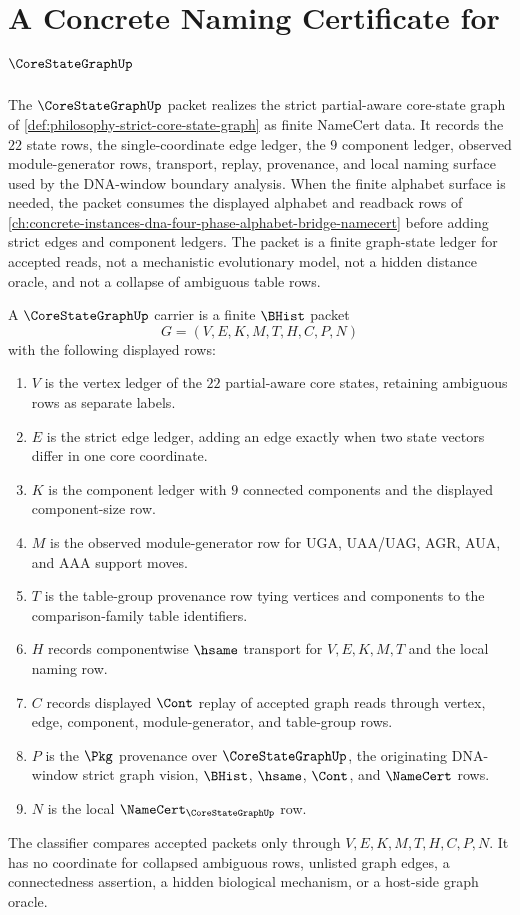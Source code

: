 \chapter{A Concrete Naming Certificate for $\CoreStateGraphUp$}
\label{ch:concrete-instances-core-state-graph-namecert}

The $\CoreStateGraphUp$ packet realizes the strict partial-aware core-state graph of \autoref{def:philosophy-strict-core-state-graph} as finite NameCert data. It records the $22$ state rows, the single-coordinate edge ledger, the $9$ component ledger, observed module-generator rows, transport, replay, provenance, and local naming surface used by the DNA-window boundary analysis. When the finite alphabet surface is needed, the packet consumes the displayed alphabet and readback rows of \autoref{ch:concrete-instances-dna-four-phase-alphabet-bridge-namecert} before adding strict edges and component ledgers. The packet is a finite graph-state ledger for accepted reads, not a mechanistic evolutionary model, not a hidden distance oracle, and not a collapse of ambiguous table rows.

\begin{definition}
\label{def:core-state-graph-carrier}
A $\CoreStateGraphUp$ carrier is a finite $\BHist$ packet
$$
G=(V,E,K,M,T,H,C,P,N)
$$
with the following displayed rows:
\begin{enumerate}
\item $V$ is the vertex ledger of the $22$ partial-aware core states, retaining ambiguous rows as separate labels.
\item $E$ is the strict edge ledger, adding an edge exactly when two state vectors differ in one core coordinate.
\item $K$ is the component ledger with $9$ connected components and the displayed component-size row.
\item $M$ is the observed module-generator row for UGA, UAA/UAG, AGR, AUA, and AAA support moves.
\item $T$ is the table-group provenance row tying vertices and components to the comparison-family table identifiers.
\item $H$ records componentwise $\hsame$ transport for $V,E,K,M,T$ and the local naming row.
\item $C$ records displayed $\Cont$ replay of accepted graph reads through vertex, edge, component, module-generator, and table-group rows.
\item $P$ is the $\Pkg$ provenance over $\CoreStateGraphUp$, the originating DNA-window strict graph vision, $\BHist$, $\hsame$, $\Cont$, and $\NameCert$ rows.
\item $N$ is the local $\NameCert_{\CoreStateGraphUp}$ row.
\end{enumerate}
The classifier compares accepted packets only through $V,E,K,M,T,H,C,P,N$. It has no coordinate for collapsed ambiguous rows, unlisted graph edges, a connectedness assertion, a hidden biological mechanism, or a host-side graph oracle.
\end{definition}

